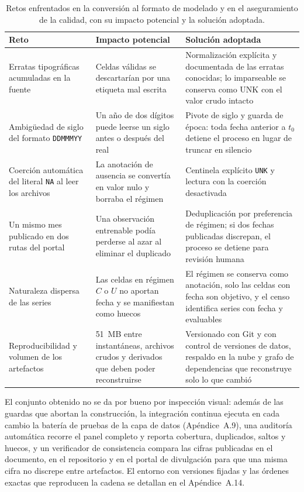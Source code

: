 \documentclass[12pt,letterpaper]{report}
\begin{document}
\begin{table}[H]
\centering
\footnotesize
\caption[Retos de conversión y calidad]{Retos enfrentados en la conversión al formato de
modelado y en el aseguramiento de la calidad, con su impacto potencial y la solución
adoptada.}
\label{tab:retos_conversion}
\begin{tabular}{p{3.5cm}p{4.0cm}p{6.0cm}}
\toprule
\rowcolor{uacjblue!15}
\textbf{Reto} & \textbf{Impacto potencial} & \textbf{Solución adoptada} \\ \midrule
Erratas tipográficas acumuladas en la fuente & Celdas válidas se descartarían por una etiqueta mal escrita & Normalización explícita y documentada de las erratas conocidas; lo imparseable se conserva como UNK con el valor crudo intacto \\
Ambigüedad de siglo del formato \texttt{DDMMMYY} & Un año de dos dígitos puede leerse un siglo antes o después del real & Pivote de siglo y guarda de época: toda fecha anterior a $t_0$ detiene el proceso en lugar de truncar en silencio \\
Coerción automática del literal \texttt{NA} al leer los archivos & La anotación de ausencia se convertía en valor nulo y borraba el régimen & Centinela explícito \texttt{UNK} y lectura con la coerción desactivada \\
Un mismo mes publicado en dos rutas del portal & Una observación entrenable podía perderse al azar al eliminar el duplicado & Deduplicación por preferencia de régimen; si dos fechas publicadas discrepan, el proceso se detiene para revisión humana \\
Naturaleza dispersa de las series & Las celdas en régimen $C$ o $U$ no aportan fecha y se manifiestan como huecos & El régimen se conserva como anotación, solo las celdas con fecha son objetivo, y el censo identifica \factNSeriesWithF{} series con fecha y \factNSeriesEvaluable{} evaluables \\
Reproducibilidad y volumen de los artefactos & 51~MB entre instantáneas, archivos crudos y derivados que deben poder reconstruirse & Versionado con Git y con control de versiones de datos, respaldo en la nube y grafo de dependencias que reconstruye solo lo que cambió \\
\bottomrule
\end{tabular}
\end{table}

El conjunto obtenido no se da por bueno por inspección visual: además de las guardas que
abortan la construcción, la integración continua ejecuta en cada cambio la batería de
pruebas de la capa de datos (Apéndice~A.9), una auditoría automática recorre el panel
completo y reporta cobertura, duplicados, saltos y huecos, y un verificador de consistencia
compara las cifras publicadas en el documento, en el repositorio y en el portal de
divulgación para que una misma cifra no discrepe entre artefactos. El entorno con versiones
fijadas y las órdenes exactas que reproducen la cadena se detallan en el Apéndice~A.14.
\end{document}
